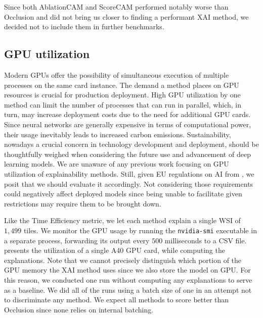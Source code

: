 Since both AblationCAM and ScoreCAM performed notably worse than Occlusion and did not bring us closer to finding a performant XAI method, we decided not to include them in further benchmarks.

\subsection*{GPU utilization}

Modern GPUs offer the possibility of simultaneous execution of multiple processes on the same card instance.
The demand a method places on GPU resources is crucial for production deployment.
High GPU utilization by one method can limit the number of processes that can run in parallel, which, in turn, may increase deployment costs due to the need for additional GPU cards.
Since neural networks are generally expensive in terms of computational power, their usage inevitably leads to increased carbon emissions.
Sustainability, nowadays a crucial concern in technology development and deployment, should be thoughtfully weighed when considering the future use and advancement of deep learning models.
We are unaware of any previous work focusing on GPU utilization of explainability methods. Still, given EU regulations on AI from , we posit that we should evaluate it accordingly.
Not considering those requirements could negatively affect deployed models since being unable to facilitate given restrictions may require them to be brought down.

Like the Time Efficiency metric, we let each method explain a single WSI of $1,499$ tiles.
We monitor the GPU usage by running the \texttt{nvidia-smi} executable in a separate process, forwarding its output every $500$ milliseconds to a CSV file.
 presents the utilization of a single A40 GPU card, while computing the explanations.
Note that we cannot precisely distinguish which portion of the GPU memory the XAI method uses since we also store the model on GPU.
For this reason, we conducted one run without computing any explanations to serve as a baseline.
We did all of the runs using a batch size of one in an attempt not to discriminate any method.
We expect all methods to score better than Occlusion since none relies on internal batching.


